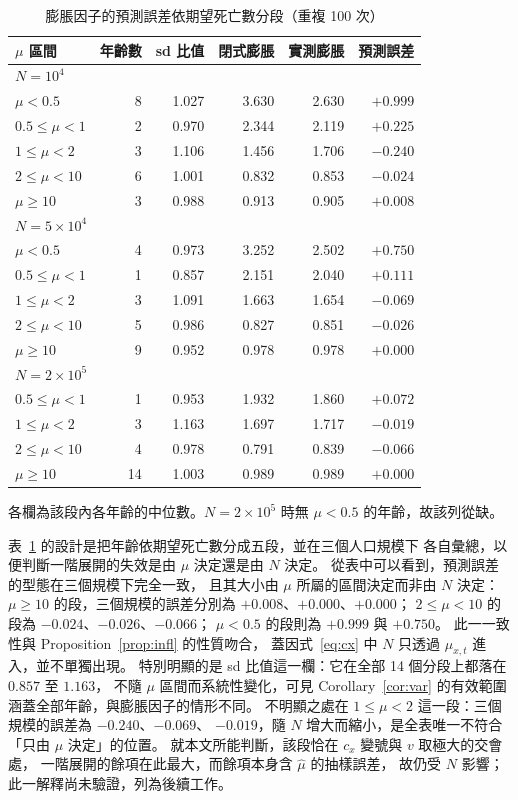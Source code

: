 \documentclass[UTF8, fontset=macnew, a4paper, 12pt]{ctexart}
\begin{document}
\begin{table}[H]
\centering
\caption{膨脹因子的預測誤差依期望死亡數分段（重複 100 次）}
\small
\begin{tabular}{lrrrrr}
\toprule
$\mu$ 區間 & 年齡數 & sd 比值 & 閉式膨脹 & 實測膨脹 & 預測誤差\\
\midrule
\multicolumn{6}{l}{\textit{$N=10^{4}$}}\\
$\mu<0.5$   & 8 & 1.027 & 3.630 & 2.630 & $+0.999$\\
$0.5\le\mu<1$ & 2 & 0.970 & 2.344 & 2.119 & $+0.225$\\
$1\le\mu<2$   & 3 & 1.106 & 1.456 & 1.706 & $-0.240$\\
$2\le\mu<10$  & 6 & 1.001 & 0.832 & 0.853 & $-0.024$\\
$\mu\ge10$    & 3 & 0.988 & 0.913 & 0.905 & $+0.008$\\
\midrule
\multicolumn{6}{l}{\textit{$N=5\times10^{4}$}}\\
$\mu<0.5$   & 4 & 0.973 & 3.252 & 2.502 & $+0.750$\\
$0.5\le\mu<1$ & 1 & 0.857 & 2.151 & 2.040 & $+0.111$\\
$1\le\mu<2$   & 3 & 1.091 & 1.663 & 1.654 & $-0.069$\\
$2\le\mu<10$  & 5 & 0.986 & 0.827 & 0.851 & $-0.026$\\
$\mu\ge10$    & 9 & 0.952 & 0.978 & 0.978 & $+0.000$\\
\midrule
\multicolumn{6}{l}{\textit{$N=2\times10^{5}$}}\\
$0.5\le\mu<1$ & 1 & 0.953 & 1.932 & 1.860 & $+0.072$\\
$1\le\mu<2$   & 3 & 1.163 & 1.697 & 1.717 & $-0.019$\\
$2\le\mu<10$  & 4 & 0.978 & 0.791 & 0.839 & $-0.066$\\
$\mu\ge10$    & 14 & 1.003 & 0.989 & 0.989 & $+0.000$\\
\bottomrule
\end{tabular}

\vspace{3pt}
{\footnotesize 各欄為該段內各年齡的中位數。$N=2\times10^{5}$ 時無 $\mu<0.5$
的年齡，故該列從缺。}
\label{tab:v3}
\end{table}

表~\ref{tab:v3} 的設計是把年齡依期望死亡數分成五段，並在三個人口規模下
各自彙總，以便判斷一階展開的失效是由 $\mu$ 決定還是由 $N$ 決定。
從表中可以看到，預測誤差的型態在三個規模下完全一致，
且其大小由 $\mu$ 所屬的區間決定而非由 $N$ 決定：
$\mu\ge10$ 的段，三個規模的誤差分別為 $+0.008$、$+0.000$、$+0.000$；
$2\le\mu<10$ 的段為 $-0.024$、$-0.026$、$-0.066$；
$\mu<0.5$ 的段則為 $+0.999$ 與 $+0.750$。
此一一致性與 Proposition~\ref{prop:infl} 的性質吻合，
蓋因式~\eqref{eq:cx} 中 $N$ 只透過 $\mu_{x,t}$ 進入，並不單獨出現。
特別明顯的是 sd 比值這一欄：它在全部 14 個分段上都落在 $0.857$ 至 $1.163$，
不隨 $\mu$ 區間而系統性變化，可見 Corollary~\ref{cor:var} 的有效範圍
涵蓋全部年齡，與膨脹因子的情形不同。
不明顯之處在 $1\le\mu<2$ 這一段：三個規模的誤差為 $-0.240$、$-0.069$、
$-0.019$，隨 $N$ 增大而縮小，是全表唯一不符合「只由 $\mu$ 決定」的位置。
就本文所能判斷，該段恰在 $c_x$ 變號與 $v$ 取極大的交會處，
一階展開的餘項在此最大，而餘項本身含 $\hat\mu$ 的抽樣誤差，
故仍受 $N$ 影響；此一解釋尚未驗證，列為後續工作。
\end{document}

